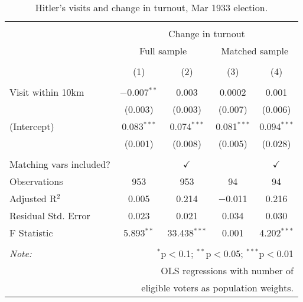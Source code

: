 
\begin{table}[!htbp] \centering 
  \caption{Hitler's visits and change in turnout, Mar 1933 election.} 
  \label{tab:ols-d_p_turnout-4} 
\begin{tabular}{@{\extracolsep{5pt}}lcccc} 
\\[-1.8ex]\hline 
\hline \\[-1.8ex] 
 & \multicolumn{4}{c}{Change in turnout} \\ 
\cline{2-5} 
 & \multicolumn{2}{c}{Full sample} & \multicolumn{2}{c}{Matched sample} \\ 
\\[-1.8ex] & (1) & (2) & (3) & (4)\\ 
\hline \\[-1.8ex] 
 Visit within 10km & $-$0.007$^{**}$ & 0.003 & 0.0002 & 0.001 \\ 
  & (0.003) & (0.003) & (0.007) & (0.006) \\ 
  (Intercept) & 0.083$^{***}$ & 0.074$^{***}$ & 0.081$^{***}$ & 0.094$^{***}$ \\ 
  & (0.001) & (0.008) & (0.005) & (0.028) \\ 
 \hline \\[-1.8ex] 
Matching vars included? &  & \multicolumn{1}{c}{$\checkmark$} &  & \multicolumn{1}{c}{$\checkmark$} \\ 
Observations & 953 & 953 & 94 & 94 \\ 
Adjusted R$^{2}$ & 0.005 & 0.214 & $-$0.011 & 0.216 \\ 
Residual Std. Error & 0.023 & 0.021 & 0.034 & 0.030 \\ 
F Statistic & 5.893$^{**}$ & 33.438$^{***}$ & 0.001 & 4.202$^{***}$ \\ 
\hline 
\hline \\[-1.8ex] 
\textit{Note:}  & \multicolumn{4}{r}{$^{*}$p$<$0.1; $^{**}$p$<$0.05; $^{***}$p$<$0.01} \\ 
 & \multicolumn{4}{r}{OLS regressions with number of} \\ 
 & \multicolumn{4}{r}{eligible voters as population weights.} \\ 
\end{tabular} 
\end{table} 
